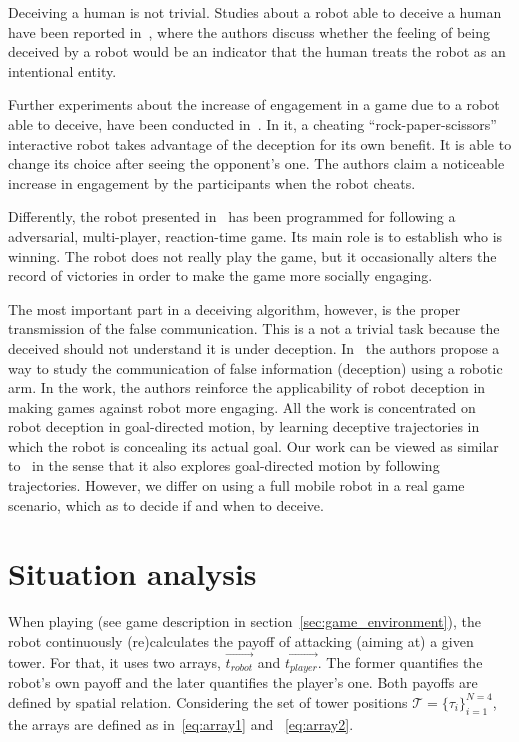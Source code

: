 Deceiving a human is not trivial. Studies about a robot able to deceive a human have been reported in~\cite{terada_can_2010}, where the authors discuss whether the feeling of being deceived by a robot would be an indicator that the human treats the robot as an intentional entity. 

Further experiments about the increase of engagement in a game due to a robot able to deceive, have been conducted in~\cite{short_no_2010}. In it, a cheating ``rock-paper-scissors'' interactive robot takes advantage of the deception for its own benefit. It is able to change its choice after seeing the opponent's one. The authors claim a noticeable increase in engagement by the participants when the robot cheats.

Differently, the robot presented in~\cite{vazquez_deceptive_2011} has been programmed for following a adversarial, multi-player, reaction-time game. Its main role is to establish who is winning. The robot does not really play the game, but it occasionally alters the record of victories in order to make the game more socially engaging.

The most important part in a deceiving algorithm, however, is the proper transmission of the false communication. This is a not a trivial task because the deceived should not understand it is under deception. In~\cite{dragan_analysis_2014} the authors propose a way to study the communication of false information (deception) using a robotic arm. In the work, the authors reinforce the applicability of robot deception in making games against robot more engaging. All the work is concentrated on robot deception in goal-directed motion, by learning deceptive trajectories in which the robot is concealing its actual goal. Our work can be viewed as similar to~\cite{dragan_analysis_2014} in the sense that it also explores goal-directed motion by following trajectories. However, we differ on using a full mobile robot in a real game scenario, which as to decide if and when to deceive. 

\section{Situation analysis}\label{sec:deception_detecting_it}
When playing (see game description in section~\ref{sec:game_environment}), the robot continuously (re)calculates the payoff of attacking (aiming at) a given tower. For that, it uses two arrays, $\overrightarrow{t_{robot}}$ and $\overrightarrow{t_{player}}$. The former quantifies the robot's own payoff and the later quantifies the player's one. Both payoffs are defined by spatial relation. Considering the set of tower positions $\mathcal{T} = \{\tau_{i}\}_{i=1}^{N=4}$, the arrays are defined as in~\ref{eq:array1} and ~\ref{eq:array2}.

